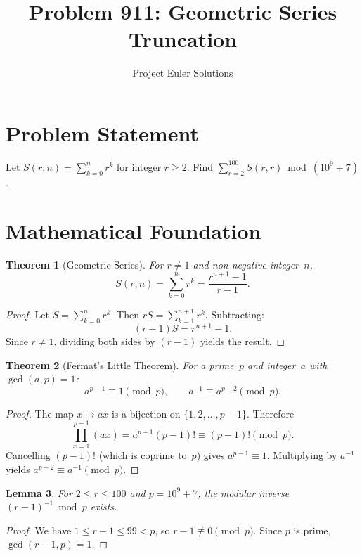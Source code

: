 \documentclass[11pt]{article}
\title{Problem 911: Geometric Series Truncation}
\author{Project Euler Solutions}
\date{}
\newtheorem{theorem}{Theorem}
\newtheorem{lemma}[theorem]{Lemma}
\begin{document}
\maketitle

\section{Problem Statement}

Let $S(r, n) = \sum_{k=0}^{n} r^k$ for integer $r \ge 2$. Find $\sum_{r=2}^{100} S(r, r) \bmod (10^9+7)$.

\section{Mathematical Foundation}

\begin{theorem}[Geometric Series]
For $r \ne 1$ and non-negative integer~$n$,
\[
S(r, n) = \sum_{k=0}^{n} r^k = \frac{r^{n+1} - 1}{r - 1}.
\]
\end{theorem}

\begin{proof}
Let $S = \sum_{k=0}^{n} r^k$. Then $rS = \sum_{k=1}^{n+1} r^k$. Subtracting:
\[
(r - 1)S = r^{n+1} - 1.
\]
Since $r \ne 1$, dividing both sides by $(r-1)$ yields the result.
\end{proof}

\begin{theorem}[Fermat's Little Theorem]
For a prime~$p$ and integer~$a$ with $\gcd(a, p) = 1$:
\[
a^{p-1} \equiv 1 \pmod{p}, \qquad a^{-1} \equiv a^{p-2} \pmod{p}.
\]
\end{theorem}

\begin{proof}
The map $x \mapsto ax$ is a bijection on $\{1, 2, \ldots, p-1\}$. Therefore
\[
\prod_{x=1}^{p-1}(ax) = a^{p-1}(p-1)! \equiv (p-1)! \pmod{p}.
\]
Cancelling $(p-1)!$ (which is coprime to~$p$) gives $a^{p-1} \equiv 1$. Multiplying by $a^{-1}$ yields $a^{p-2} \equiv a^{-1} \pmod{p}$.
\end{proof}

\begin{lemma}
For $2 \le r \le 100$ and $p = 10^9 + 7$, the modular inverse $(r-1)^{-1} \bmod p$ exists.
\end{lemma}

\begin{proof}
We have $1 \le r - 1 \le 99 < p$, so $r - 1 \not\equiv 0 \pmod{p}$. Since $p$ is prime, $\gcd(r-1, p) = 1$.
\end{proof}
\end{document}

